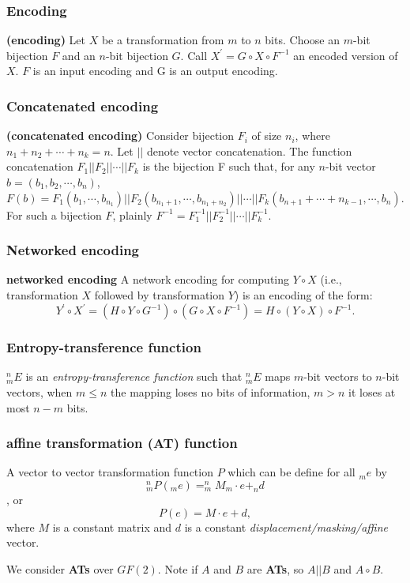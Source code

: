\documentclass{beamer}
\begin{document}
\frame
{
\frametitle{Encoding}
\begin{definition}{\textbf{(encoding)}}
Let $X$ be a transformation from $m$ to $n$ bits. Choose an $m$-bit bijection $F$ and an $n$-bit bijection $G$. Call $X^{'}=G \circ X \circ F^{-1}$ an encoded version of $X$. $F$ is an input encoding and G is an output encoding.
\end{definition}
}

\frame
{
\frametitle{Concatenated encoding}
\begin{definition}{\textbf{(concatenated encoding)}}
Consider bijection $F_{i}$ of size $n_{i}$, where $n_{1} + n_{2} + \cdots + n_{k}=n$. Let $||$ denote vector concatenation.
The function concatenation $F_{1}||F_{2}||\cdots||F_{k}$ is the bijection F such that, for any $n$-bit vector $b = (b_{1}, b_{2}, \cdots, b_{n})$, $F(b) = F_{1}(b_{1}, \cdots, b_{n_{1}})||F_{2}(b_{n_{1}+1}, \cdots, b_{n_{1}+n_{2}})||\cdots||F_{k}(b_{n+1}+\cdots+n_{k-1}, \cdots, b_{n})$. For such a bijection $F$, plainly $F^{-1} = F^{-1}_{1}||F^{-1}_{2}||\cdots||F^{-1}_{k}$.
\end{definition}

}

\frame
{
\frametitle{Networked encoding}
\begin{definition}{\textbf{networked encoding}}
A network encoding for computing $Y \circ X$ (i.e., transformation $X$ followed by transformation $Y$) is an encoding of the form:
\[Y^{'} \circ X^{'} = (H \circ Y \circ G^{-1}) \circ (G \circ X \circ F^{-1}) = H \circ (Y \circ X) \circ F^{-1}.\]
\end{definition}

}

\frame
{
\frametitle{Entropy-transference function}
$^{n}_{m}E$ is an \textit{entropy-transference function} such that $^{n}_{m}E$ maps $m$-bit vectors to $n$-bit vectors, when $m \leq n$ the mapping loses no bits of information, $m > n$ it loses at most $n-m$ bits.
}

\frame
{
\frametitle{affine transformation (\textbf{AT}) function}
A vector to vector transformation function $P$ which can be define for all $_{m}e$ by \[^{n}_{m}P(_{m}e)= ^{n}_{m}M_{m}\cdot e + _{n}d\], or \[P(e)=M\cdot e + d,\]
where $M$ is a constant matrix and $d$ is a constant \textit{displacement/masking/affine} vector.

We consider \textbf{ATs} over $GF(2)$. Note if $A$ and $B$ are \textbf{ATs}, so $A||B$ and $A \circ B$.
}
\end{document}
